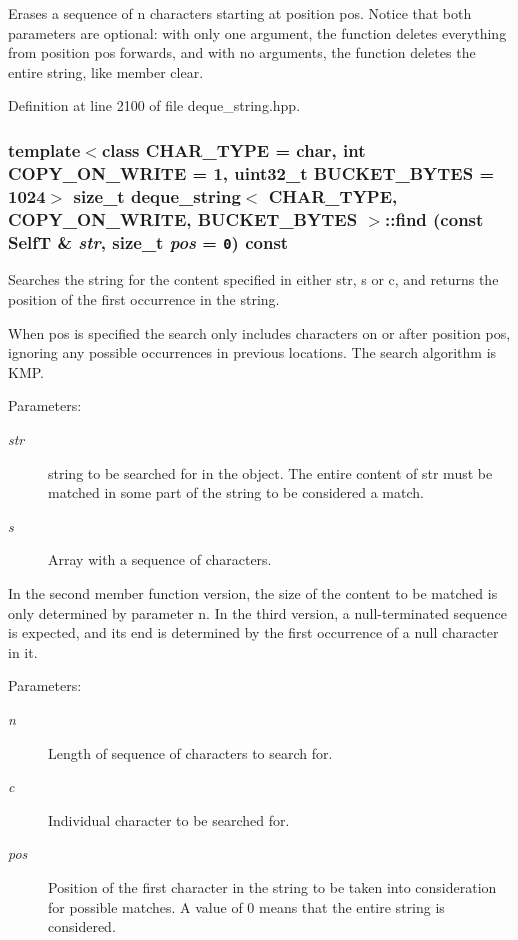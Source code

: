 Erases a sequence of n characters starting at position pos. Notice that both parameters are optional: with only one argument, the function deletes everything from position pos forwards, and with no arguments, the function deletes the entire string, like member clear. 

Definition at line 2100 of file deque\_\-string.hpp.\hypertarget{classdeque__string_2be9ae2c2547e5d4086aa7aabd1de547}{
\subsubsection[{find}]{\setlength{\rightskip}{0pt plus 5cm}template$<$class CHAR\_\-TYPE  = char, int COPY\_\-ON\_\-WRITE = 1, uint32\_\-t BUCKET\_\-BYTES = 1024$>$ size\_\-t {\bf deque\_\-string}$<$ CHAR\_\-TYPE, COPY\_\-ON\_\-WRITE, BUCKET\_\-BYTES $>$::find (const {\bf SelfT} \& {\em str}, \/  size\_\-t {\em pos} = {\tt 0}) const}}
\label{classdeque__string_2be9ae2c2547e5d4086aa7aabd1de547}


Searches the string for the content specified in either str, s or c, and returns the position of the first occurrence in the string.

When pos is specified the search only includes characters on or after position pos, ignoring any possible occurrences in previous locations. The search algorithm is KMP.

\begin{Desc}
\item[Parameters:]
\begin{description}
\item[{\em str}]string to be searched for in the object. The entire content of str must be matched in some part of the string to be considered a match. \item[{\em s}]Array with a sequence of characters.\end{description}
\end{Desc}
In the second member function version, the size of the content to be matched is only determined by parameter n. In the third version, a null-terminated sequence is expected, and its end is determined by the first occurrence of a null character in it.

\begin{Desc}
\item[Parameters:]
\begin{description}
\item[{\em n}]Length of sequence of characters to search for. \item[{\em c}]Individual character to be searched for. \item[{\em pos}]Position of the first character in the string to be taken into consideration for possible matches. A value of 0 means that the entire string is considered. \end{description}
\end{Desc}


